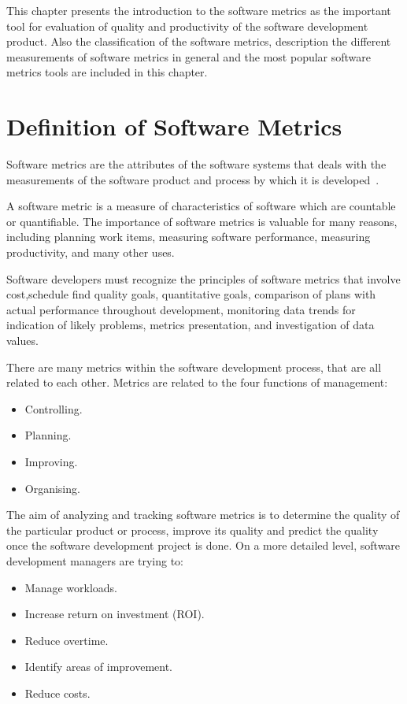 This chapter presents the introduction to the software metrics as the important tool for evaluation of quality and productivity of the software development product. Also the classification of the software metrics, description the different measurements of software metrics in general and the most popular software metrics tools are included in this chapter.


\section{Definition of Software Metrics}

Software metrics are the attributes of the software systems that deals with the measurements of the software product and process by which it is developed~\cite{metrix}.
 
A software metric is a measure of characteristics of software which are countable or quantifiable. The importance of software metrics is valuable for many reasons, including planning work items, measuring software performance, measuring productivity, and many other uses.

Software developers must recognize the principles of software metrics that involve cost,schedule find quality goals, quantitative goals, comparison of plans with actual performance throughout development, monitoring data trends for indication of likely problems, metrics presentation, and investigation of data values.

There are many metrics within the software development process, that are all related to each other. Metrics are related to the four functions of management:

\begin{itemize}
	\item Controlling.
	\item Planning.
	\item Improving.
	\item Organising.
\end{itemize}

The aim of analyzing and tracking software metrics is to determine the quality of the particular product or process, improve its quality and predict the quality once the software development project is done. On a more detailed level, software development managers are trying to:

\begin{itemize}
	\item Manage workloads.
	\item Increase return on investment (ROI).
	\item Reduce overtime.
	\item Identify areas of improvement.
	\item Reduce costs.
\end{itemize}

